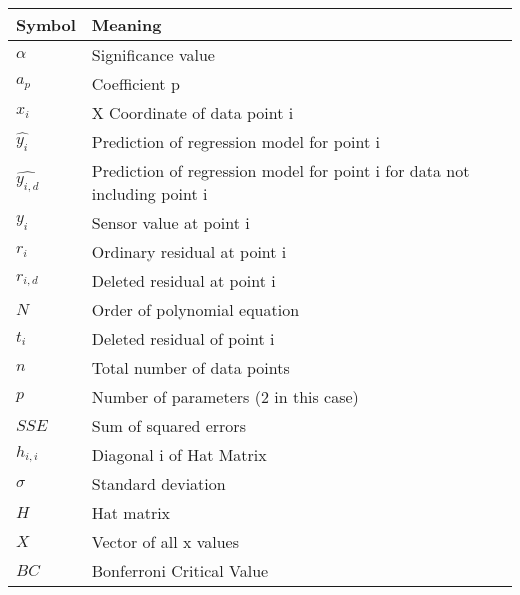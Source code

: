 \documentclass{article}
\begin{document}
\begin{table}[h!]
	\begin{center}

		\begin{tabular}{l|l} %
			\textbf{Symbol} & \textbf{Meaning} \\
			\hline
			$\alpha$ & Significance value\\
			$a_p$ & Coefficient p\\
			$x_i$ & X Coordinate of data point i\\
			$\hat{y_i}$ & Prediction of regression model for point i \\
			$\hat{y_{i,d}}$ & Prediction of regression model for point i for data not including point i \\
			$y_i$ & Sensor value at point i \\
			$r_i$ & Ordinary residual at point i \\
			$r_{i, d}$ & Deleted residual at point i \\
			$N$ & Order of polynomial equation \\
			$t_i$ & Deleted residual of point i \\
			$n$ & Total number of data points \\
			$p$ & Number of parameters (2 in this case) \\
			$SSE$ & Sum of squared errors \\
			$h_{i,i}$ & Diagonal i of Hat Matrix \\
			$\sigma$ & Standard deviation \\
			$H$ & Hat matrix \\
			$X$ & Vector of all x values \\
			$BC$ & Bonferroni Critical Value \\
		\end{tabular}
	\end{center}
\end{table}
\end{document}
